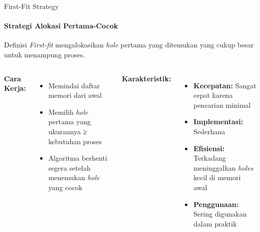 \documentclass[10pt,aspectratio=169]{beamer}
\begin{document}
\begin{frame}{First-Fit Strategy}
    \framesubtitle{Strategi Alokasi Pertama-Cocok}
    
    \begin{block}{Definisi}
        \textit{First-fit} mengalokasikan \textit{hole} pertama yang ditemukan yang cukup besar untuk menampung proses.
    \end{block}
    
    \begin{columns}[T]
            \textbf{Cara Kerja:}
            \begin{itemize}
                \item Memindai daftar memori dari awal
                \item Memilih \textit{hole} pertama yang ukurannya ≥ kebutuhan proses
                \item Algoritma berhenti segera setelah menemukan \textit{hole} yang cocok
            \end{itemize}
            
            \textbf{Karakteristik:}
            \begin{itemize}
                \item \textbf{Kecepatan:} Sangat cepat karena pencarian minimal
                \item \textbf{Implementasi:} Sederhana
                \item \textbf{Efisiensi:} Terkadang meninggalkan \textit{holes} kecil di memori awal
                \item \textbf{Penggunaan:} Sering digunakan dalam praktik
            \end{itemize}
    \end{columns}
\end{frame}
\end{document}
